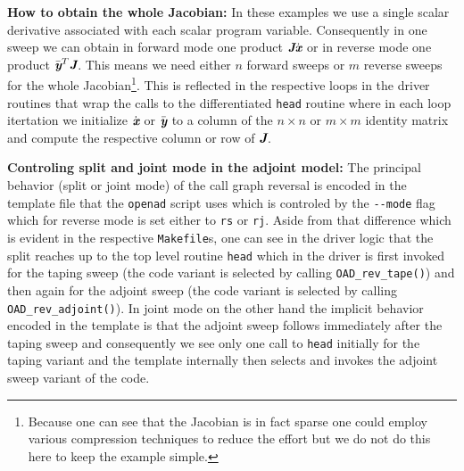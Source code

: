 \documentclass{book}
\newcommand{\bmJ}{\mbox{\bf\em J}}
\newcommand{\bmx}{\mbox{\bf\em x}}
\newcommand{\bmy}{\mbox{\bf\em y}}
\begin{document}
\noindent
{\bf How to obtain the whole Jacobian:} In these examples we use a single scalar derivative associated with each scalar program variable. 
Consequently in one sweep we can obtain in forward mode one product $\bmJ\dot{\bmx}$ or in reverse mode one product $\bar{\bmy}^T\bmJ$. 
This means we need either $n$ forward sweeps or $m$ reverse sweeps for the whole Jacobian\footnote{Because one can see that the Jacobian 
is in fact sparse one could employ various compression techniques to reduce the effort but we do not do this here to keep the example simple.}.   
This is reflected in the respective loops in the driver routines that wrap the calls to the differentiated \lstinline{head} routine where in each loop
itertation we 
initialize $\dot{\bmx}$ or $\bar{\bmy}$ to a column of the $n\times n$ or $m\times m$ identity matrix and compute the respective 
column or row of $\bmJ$.

\noindent
{\bf Controling split and joint mode in the adjoint model:} The principal behavior (split or joint mode) of the call graph reversal is encoded 
in the template file that the \lstinline{openad} script uses which is controled by the \lstinline{--mode} flag which for reverse mode is set 
either to \lstinline{rs} or \lstinline{rj}. Aside from that difference which is evident in the respective \lstinline{Makefile}s, one can 
see in the driver logic that the split reaches up to the top level routine \lstinline{head} which in the driver is first invoked 
for the taping sweep (the code variant is selected by calling \lstinline{OAD_rev_tape()}) 
and then again for the adjoint sweep  (the code variant is selected by calling  \lstinline{OAD_rev_adjoint()}). 
In joint mode on the other hand the implicit behavior encoded in the template is that the adjoint sweep follows immediately after 
the taping sweep and consequently we see only one call to \lstinline{head} initially for the taping variant  
and the template internally then selects and invokes the adjoint sweep variant of the code.    
\end{document}
